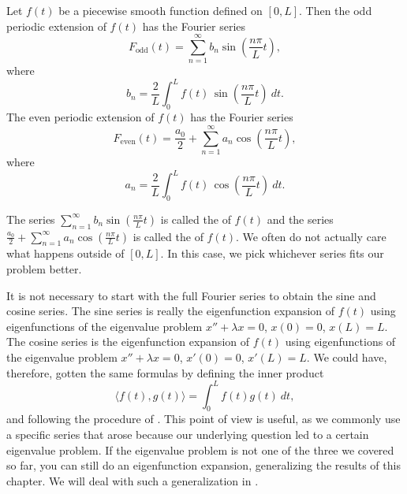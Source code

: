 \begin{theorem}
Let $f(t)$ be a piecewise smooth function defined on $[0,L]$.
Then the odd periodic extension
of $f(t)$ has the Fourier series
\begin{equation*}
\boxed{~~
F_{\text{odd}}(t) = \sum_{n=1}^\infty b_n \sin \left( \frac{n \pi}{L} t
\right) ,
~~}
\end{equation*}
where
\begin{equation*}
\boxed{~~
b_n = 
\frac{2}{L} \int_{0}^L f(t)\, \sin \left( \frac{n \pi}{L} t \right) ~ dt .
~~}
\end{equation*}
The even periodic extension of $f(t)$ has the Fourier series
\begin{equation*}
\boxed{~~
F_{\text{even}}(t) = \frac{a_0}{2} + \sum_{n=1}^\infty a_n \cos \left(
\frac{n \pi}{L} t \right) ,
~~}
\end{equation*}
where
\begin{equation*}
\boxed{~~
a_n = 
\frac{2}{L} \int_{0}^L f(t)\, \cos \left( \frac{n \pi}{L} t \right) ~ dt .
~~}
\end{equation*}
\end{theorem}

The series $\sum_{n=1}^\infty b_n \sin \left( \frac{n \pi}{L} t\right)$ is called
the \emph{} of $f(t)$ and the series
$\frac{a_0}{2} + \sum_{n=1}^\infty a_n \cos \left( \frac{n \pi}{L} t
\right)$
is called the \emph{} of $f(t)$.  
We often do not actually care what happens outside of $[0,L]$.  In this case,
we pick whichever series fits our problem better.

It is not necessary to start with the full Fourier series to obtain
the sine and cosine series.
The sine series is really the eigenfunction expansion of $f(t)$ using 
eigenfunctions of the eigenvalue problem $x''+\lambda x = 0$, $x(0) = 0$,
$x(L) = L$.  The cosine series is the eigenfunction expansion of $f(t)$
using 
eigenfunctions of the eigenvalue problem $x''+\lambda x = 0$, $x'(0) = 0$,
$x'(L) = L$.  We could have, therefore, gotten the same formulas
by defining the inner product
\begin{equation*}
\langle f(t), g(t) \rangle = \int_0^L f(t) g(t) ~ dt ,
\end{equation*}
and following the procedure of .  This point of view is
useful, as we commonly use a specific series that arose because our underlying
question 
led to a certain eigenvalue problem.  If the eigenvalue 
problem is not one of the three we covered so far, you can still do an
eigenfunction expansion, generalizing the results of this chapter.  We will
deal with such a generalization in .

